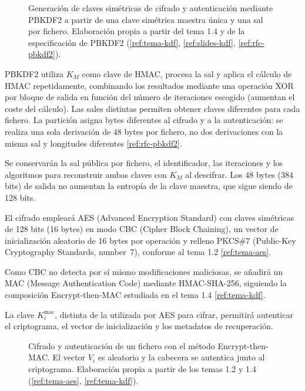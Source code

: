 \begin{figure}[H]
  \centering
  \resizebox{\linewidth}{!}{}
  \caption{Generación de claves simétricas de cifrado y autenticación mediante PBKDF2 a partir de una clave simétrica maestra única y una sal por fichero. Elaboración propia a partir del tema 1.4 y de la especificación de PBKDF2 (\ref{ref:tema-kdf}, \ref{ref:slides-kdf}, \ref{ref:rfc-pbkdf2}).}
  \label{fig:p1-derivacion}
\end{figure}

PBKDF2 utiliza $K_M$ como clave de HMAC, procesa la sal y aplica el cálculo de HMAC repetidamente, combinando los resultados mediante una operación XOR por bloque de salida en función del número de iteraciones escogido (aumentan el coste del cálculo).
Las sales distintas permiten obtener claves diferentes para cada fichero. La partición asigna bytes diferentes al cifrado y a la autenticación: se realiza una sola derivación de 48 bytes por fichero, no dos derivaciones con la misma sal y longitudes diferentes \ref{ref:rfc-pbkdf2}.

Se conservarán la sal pública por fichero, el identificador, las iteraciones y los algoritmos para reconstruir ambas claves con $K_M$ al descifrar. Los 48 bytes (384 bits) de salida no aumentan la entropía de la clave maestra, que sigue siendo de 128 bits.

El cifrado empleará AES (Advanced Encryption Standard) con claves simétricas de 128 bits (16 bytes) en modo CBC (Cipher Block Chaining), un vector de inicialización aleatorio de 16 bytes por operación y relleno PKCS\#7 (Public-Key Cryptography Standards, number~7), conforme al tema 1.2 \ref{ref:tema-aes}.

Como CBC no detecta por sí mismo modificaciones maliciosas, se añadirá un MAC (Message Authentication Code) mediante HMAC-SHA-256, siguiendo la composición Encrypt-then-MAC estudiada en el tema 1.4 \ref{ref:tema-kdf}.

La clave $K_i^{\mathrm{mac}}$, distinta de la utilizada por AES para cifrar, permitirá autenticar el criptograma, el vector de inicialización y los metadatos de recuperación.

\begin{figure}[H]
  \centering
  \resizebox{\linewidth}{!}{}
  \caption{Cifrado y autenticación de un fichero con el método Encrypt-then-MAC. El vector $V_i$ es aleatorio y la cabecera se autentica junto al criptograma. Elaboración propia a partir de los temas 1.2 y 1.4 (\ref{ref:tema-aes}, \ref{ref:tema-kdf}).}
  \label{fig:p1-cifrado}
\end{figure}

